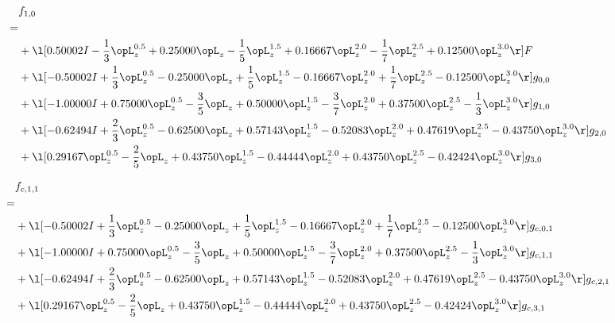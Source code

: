 \begin{alignat}{2} 
\label{eq:f_10_0} 
& f_{1,0} \nonumber \\ 
 = \\ 
& + \l[  0.50002 I - \frac{1}{3} \opL_z^{0.5} +  0.25000 \opL_z - \frac{1}{5} \opL_z^{1.5} +  0.16667 \opL_z^{2.0} - \frac{1}{7} \opL_z^{2.5} +  0.12500 \opL_z^{3.0}  \r] F \nonumber \\ 
& + \l[  -0.50002 I + \frac{1}{3} \opL_z^{0.5}   -0.25000 \opL_z + \frac{1}{5} \opL_z^{1.5}   -0.16667 \opL_z^{2.0} + \frac{1}{7} \opL_z^{2.5}   -0.12500 \opL_z^{3.0}  \r] g_{0,0} \nonumber \\ 
& + \l[  -1.00000 I +  0.75000 \opL_z^{0.5} - \frac{3}{5} \opL_z +  0.50000 \opL_z^{1.5} - \frac{3}{7} \opL_z^{2.0} +  0.37500 \opL_z^{2.5} - \frac{1}{3} \opL_z^{3.0}  \r] g_{1,0} \nonumber \\ 
& + \l[  -0.62494 I + \frac{2}{3} \opL_z^{0.5}   -0.62500 \opL_z +  0.57143 \opL_z^{1.5}   -0.52083 \opL_z^{2.0} +  0.47619 \opL_z^{2.5}   -0.43750 \opL_z^{3.0}  \r] g_{2,0} \nonumber \\ 
& + \l[  0.29167 \opL_z^{0.5} - \frac{2}{5} \opL_z +  0.43750 \opL_z^{1.5}   -0.44444 \opL_z^{2.0} +  0.43750 \opL_z^{2.5}   -0.42424 \opL_z^{3.0}  \r] g_{3,0} \nonumber \\ 
\end{alignat} 


\begin{alignat}{2} 
\label{eq:f_11_0} 
& f_{c,1,1} \nonumber \\ 
 = \\ 
& + \l[  -0.50002 I + \frac{1}{3} \opL_z^{0.5}   -0.25000 \opL_z + \frac{1}{5} \opL_z^{1.5}   -0.16667 \opL_z^{2.0} + \frac{1}{7} \opL_z^{2.5}   -0.12500 \opL_z^{3.0}  \r] g_{c,0,1} \nonumber \\ 
& + \l[  -1.00000 I +  0.75000 \opL_z^{0.5} - \frac{3}{5} \opL_z +  0.50000 \opL_z^{1.5} - \frac{3}{7} \opL_z^{2.0} +  0.37500 \opL_z^{2.5} - \frac{1}{3} \opL_z^{3.0}  \r] g_{c,1,1} \nonumber \\ 
& + \l[  -0.62494 I + \frac{2}{3} \opL_z^{0.5}   -0.62500 \opL_z +  0.57143 \opL_z^{1.5}   -0.52083 \opL_z^{2.0} +  0.47619 \opL_z^{2.5}   -0.43750 \opL_z^{3.0}  \r] g_{c,2,1} \nonumber \\ 
& + \l[  0.29167 \opL_z^{0.5} - \frac{2}{5} \opL_z +  0.43750 \opL_z^{1.5}   -0.44444 \opL_z^{2.0} +  0.43750 \opL_z^{2.5}   -0.42424 \opL_z^{3.0}  \r] g_{c,3,1} \nonumber \\ 
\end{alignat} 


